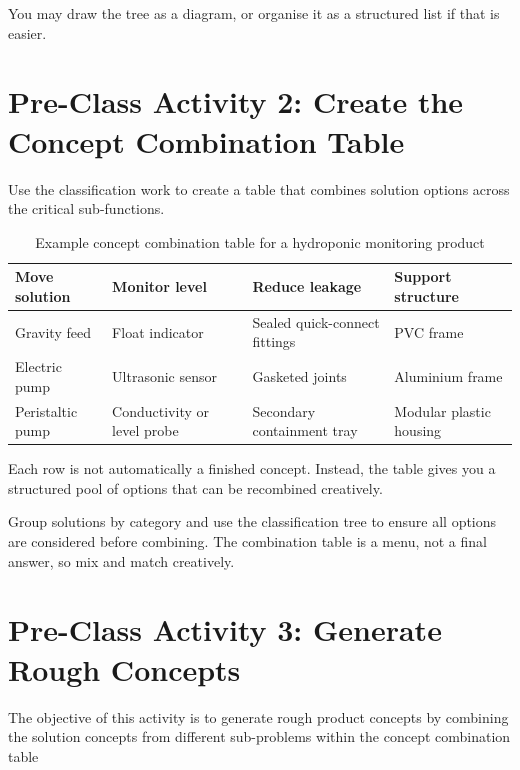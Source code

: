 You may draw the tree as a diagram, or organise it as a structured list if that is easier.

\section{Pre-Class Activity 2: Create the Concept Combination Table}
\label{sec:create_concept_comb_table}
Use the classification work to create a table that combines solution options across the critical sub-functions.

\begin{table}[htbp]
\centering
\caption{Example concept combination table for a hydroponic monitoring product}
\label{tab:session10-combination-table}
\renewcommand{\arraystretch}{1.2}
\begin{tabularx}{\textwidth}{|>{\raggedright\arraybackslash}p{}|>{\raggedright\arraybackslash}p{}|>{\raggedright\arraybackslash}p{}|>{\raggedright\arraybackslash}X|}
\hline
\textbf{Move solution} & \textbf{Monitor level} & \textbf{Reduce leakage} & \textbf{Support structure} \\
\hline
Gravity feed & Float indicator & Sealed quick-connect fittings & PVC frame \\
\hline
Electric pump & Ultrasonic sensor & Gasketed joints & Aluminium frame \\
\hline
Peristaltic pump & Conductivity or level probe & Secondary containment tray & Modular plastic housing \\
\hline
\end{tabularx}
\end{table}

Each row is not automatically a finished concept. Instead, the table gives you a structured pool of options that can be recombined creatively.

\begin{tcolorbox}[title=Hint]
Group solutions by category and use the classification tree to ensure all options are considered before combining. The combination table is a menu, not a final answer, so mix and match creatively.
\end{tcolorbox}

\section{Pre-Class Activity 3: Generate Rough Concepts}

The objective of this activity is to generate rough product concepts by combining the solution concepts from different sub-problems within the concept combination table

